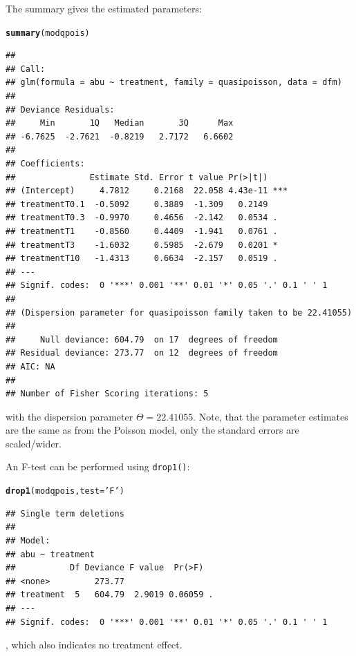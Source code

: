 \documentclass{scrartcl}\usepackage[]{graphicx}\usepackage[]{color}
\makeatletter
\newcommand{\hlstr}[1]{\textcolor[rgb]{0.192,0.494,0.8}{#1}}%
\newcommand{\hlstd}[1]{\textcolor[rgb]{0.345,0.345,0.345}{#1}}%
\newcommand{\hlkwc}[1]{\textcolor[rgb]{0.333,0.667,0.333}{#1}}%
\newcommand{\hlkwd}[1]{\textcolor[rgb]{0.737,0.353,0.396}{\textbf{#1}}}%
\newenvironment{kframe}{%
 \def\at@end@of@kframe{}%
 \ifinner\ifhmode%
  \def\at@end@of@kframe{\end{minipage}}%
  \begin{minipage}{\columnwidth}%
 \fi\fi%
 \def\FrameCommand##1{\hskip\@totalleftmargin \hskip-\fboxsep
 \colorbox{shadecolor}{##1}\hskip-\fboxsep
     \hskip-\linewidth \hskip-\@totalleftmargin \hskip\columnwidth}%
 \MakeFramed {\advance\hsize-\width
   \@totalleftmargin\z@ \linewidth\hsize
   \@setminipage}}%
 {\par\unskip\endMakeFramed%
 \at@end@of@kframe}
\newenvironment{knitrout}{}{} %
\makeatother
\begin{document}
The summary gives the estimated parameters:
\begin{knitrout}
\color{fgcolor}\begin{kframe}
\begin{alltt}
\hlkwd{summary}\hlstd{(modqpois)}
\end{alltt}
\begin{verbatim}
## 
## Call:
## glm(formula = abu ~ treatment, family = quasipoisson, data = dfm)
## 
## Deviance Residuals: 
##     Min       1Q   Median       3Q      Max  
## -6.7625  -2.7621  -0.8219   2.7172   6.6602  
## 
## Coefficients:
##               Estimate Std. Error t value Pr(>|t|)    
## (Intercept)     4.7812     0.2168  22.058 4.43e-11 ***
## treatmentT0.1  -0.5092     0.3889  -1.309   0.2149    
## treatmentT0.3  -0.9970     0.4656  -2.142   0.0534 .  
## treatmentT1    -0.8560     0.4409  -1.941   0.0761 .  
## treatmentT3    -1.6032     0.5985  -2.679   0.0201 *  
## treatmentT10   -1.4313     0.6634  -2.157   0.0519 .  
## ---
## Signif. codes:  0 '***' 0.001 '**' 0.01 '*' 0.05 '.' 0.1 ' ' 1
## 
## (Dispersion parameter for quasipoisson family taken to be 22.41055)
## 
##     Null deviance: 604.79  on 17  degrees of freedom
## Residual deviance: 273.77  on 12  degrees of freedom
## AIC: NA
## 
## Number of Fisher Scoring iterations: 5
\end{verbatim}
\end{kframe}
\end{knitrout}

with the dispersion parameter $\Theta = 22.41055$. 
Note, that the parameter estimates are the same as from the Poisson model, only the standard errors are scaled/wider.

An F-test can be performed using \texttt{drop1()}:
\begin{knitrout}
\color{fgcolor}\begin{kframe}
\begin{alltt}
\hlkwd{drop1}\hlstd{(modqpois,} \hlkwc{test} \hlstd{=} \hlstr{'F'}\hlstd{)}
\end{alltt}
\begin{verbatim}
## Single term deletions
## 
## Model:
## abu ~ treatment
##           Df Deviance F value  Pr(>F)  
## <none>         273.77                  
## treatment  5   604.79  2.9019 0.06059 .
## ---
## Signif. codes:  0 '***' 0.001 '**' 0.01 '*' 0.05 '.' 0.1 ' ' 1
\end{verbatim}
\end{kframe}
\end{knitrout}
, which also indicates no treatment effect.
\end{document}
